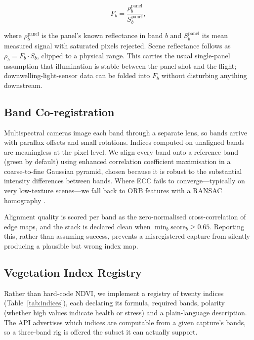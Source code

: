 \documentclass[conference]{IEEEtran}
\begin{document}
\begin{equation}
F_b = \frac{\rho_b^{\text{panel}}}{S_b^{\text{panel}}},
\end{equation}

where $\rho_b^{\text{panel}}$ is the panel's known reflectance in band $b$ and
$S_b^{\text{panel}}$ its mean measured signal with saturated pixels rejected.
Scene reflectance follows as $\rho_b = F_b \cdot S_b$, clipped to a physical
range. This carries the usual single-panel assumption that illumination is
stable between the panel shot and the flight; downwelling-light-sensor data can
be folded into $F_b$ without disturbing anything downstream.

\subsection{Band Co-registration}

Multispectral cameras image each band through a separate lens, so bands arrive
with parallax offsets and small rotations. Indices computed on unaligned bands
are meaningless at the pixel level. We align every band onto a reference band
(green by default) using enhanced correlation coefficient maximisation
\cite{evangelidis2008} in a coarse-to-fine Gaussian pyramid, chosen because it
is robust to the substantial intensity differences between bands. Where ECC
fails to converge---typically on very low-texture scenes---we fall back to ORB
features \cite{rublee2011} with a RANSAC homography \cite{fischler1981}.

Alignment quality is scored per band as the zero-normalised cross-correlation
of edge maps, and the stack is declared clean when
$\min_b \text{score}_b \geq 0.65$. Reporting this, rather than assuming
success, prevents a misregistered capture from silently producing a plausible
but wrong index map.

\subsection{Vegetation Index Registry}

Rather than hard-code NDVI, we implement a registry of twenty indices
(Table~\ref{tab:indices}), each declaring its formula, required bands,
polarity (whether high values indicate health or stress) and a plain-language
description. The API advertises which indices are computable from a given
capture's bands, so a three-band rig is offered the subset it can actually
support.
\end{document}
